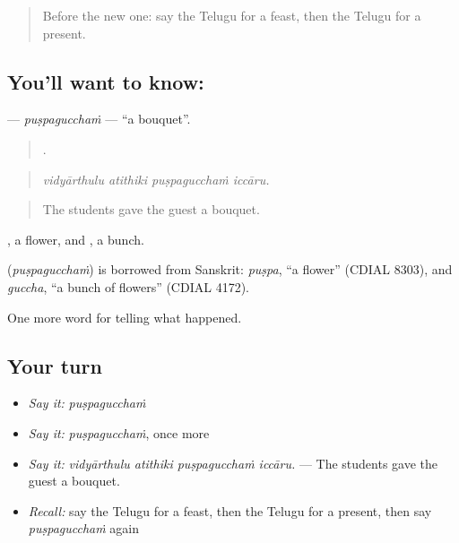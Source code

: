 \label{lesson:TE-C347-puspaguccham}



\begin{quote}
Before the new one: say the Telugu for a feast, then the Telugu for a present.
\end{quote}

\subsection*{You'll want to know: }
\textbf{} — \emph{puṣpagucchaṁ} — \textquotedblleft{}a bouquet\textquotedblright{}.

\begin{quote}
   .
\end{quote}

\begin{quote}
\emph{vidyārthulu atithiki puṣpagucchaṁ iccāru.}
\end{quote}

\begin{quote}
The students gave the guest a bouquet.
\end{quote}

, a flower, and , a bunch.

\begin{cousinweb}
\textbf{} (\emph{puṣpagucchaṁ}) is borrowed from Sanskrit: \emph{puṣpa}, \textquotedblleft{}a flower\textquotedblright{} (CDIAL 8303), and \emph{guccha}, \textquotedblleft{}a bunch of flowers\textquotedblright{} (CDIAL 4172).
\end{cousinweb}

\begin{grammarlens}[title={What you've built}]
One more word for telling what happened.
\end{grammarlens}

\subsection*{Your turn}
\begin{itemize}
\raggedright
  \item \emph{Say it:} \emph{puṣpagucchaṁ}
  \item \emph{Say it:} \emph{puṣpagucchaṁ}, once more
  \item \emph{Say it:} \emph{vidyārthulu atithiki puṣpagucchaṁ iccāru.} — The students gave the guest a bouquet.
  \item \emph{Recall:} say the Telugu for a feast, then the Telugu for a present, then say \emph{puṣpagucchaṁ} again
\end{itemize}

